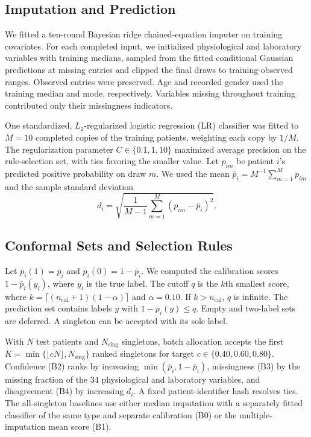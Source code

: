 \documentclass[conference]{IEEEtran}
\newcommand{\pmean}{\bar{p}}
\begin{document}
\subsection{Imputation and Prediction}

We fitted a ten-round Bayesian ridge chained-equation imputer on training covariates. For each completed input, we initialized physiological and laboratory variables with training medians, sampled from the fitted conditional Gaussian predictions at missing entries and clipped the final draws to training-observed ranges. Observed entries were preserved. Age and recorded gender used the training median and mode, respectively. Variables missing throughout training contributed only their missingness indicators.

One standardized, $L_2$-regularized logistic regression (LR) classifier was fitted to $M = 10$ completed copies of the training patients, weighting each copy by $1/M$. The regularization parameter $C \in \{0.1, 1, 10\}$ maximized average precision on the rule-selection set, with ties favoring the smaller value. Let $p_{im}$ be patient $i$'s predicted positive probability on draw $m$. We used the mean $\pmean_i = M^{-1}\sum_{m=1}^{M} p_{im}$ and the sample standard deviation
\begin{equation}
d_i = \sqrt{\frac{1}{M-1}\sum_{m=1}^{M}\left(p_{im}-\pmean_i\right)^2}.
\label{eq:disagreement}
\end{equation}

\subsection{Conformal Sets and Selection Rules}

Let $\pmean_i(1) = \pmean_i$ and $\pmean_i(0) = 1-\pmean_i$. We computed the calibration scores $1-\pmean_i(y_i)$, where $y_i$ is the true label. The cutoff $q$ is the $k$th smallest score, where $k = \lceil (n_{\mathrm{cal}}+1)(1-\alpha) \rceil$ and $\alpha = 0.10$. If $k > n_{\mathrm{cal}}$, $q$ is infinite. The prediction set contains labels $y$ with $1-\pmean_i(y) \le q$. Empty and two-label sets are deferred. A singleton can be accepted with its sole label.

With $N$ test patients and $N_{\mathrm{sing}}$ singletons, batch allocation accepts the first $K = \min\{\lfloor cN \rfloor, N_{\mathrm{sing}}\}$ ranked singletons for target $c \in \{0.40, 0.60, 0.80\}$. Confidence (B2) ranks by increasing $\min(\pmean_i, 1-\pmean_i)$, missingness (B3) by the missing fraction of the 34 physiological and laboratory variables, and disagreement (B4) by increasing $d_i$. A fixed patient-identifier hash resolves ties. The all-singleton baselines use either median imputation with a separately fitted classifier of the same type and separate calibration (B0) or the multiple-imputation mean score (B1).
\end{document}
